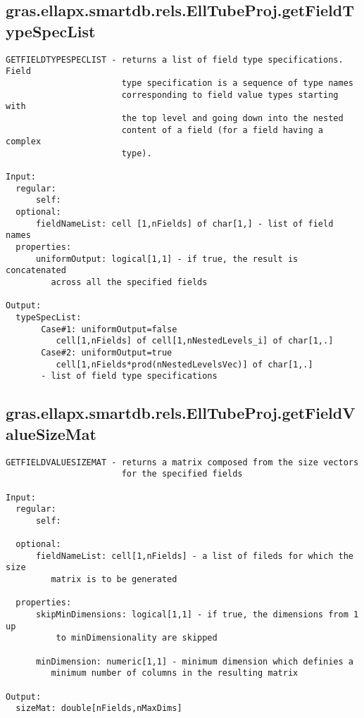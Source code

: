 \subsection{\texorpdfstring{gras.ellapx.smartdb.rels.EllTubeProj.getFieldTypeSpecList}{getFieldTypeSpecList}}\label{method:gras.ellapx.smartdb.rels.EllTubeProj.getFieldTypeSpecList}
\begin{verbatim}
GETFIELDTYPESPECLIST - returns a list of field type specifications. Field
                       type specification is a sequence of type names
                       corresponding to field value types starting with
                       the top level and going down into the nested
                       content of a field (for a field having a complex
                       type).

Input:
  regular:
      self:
  optional:
      fieldNameList: cell [1,nFields] of char[1,] - list of field names
  properties:
      uniformOutput: logical[1,1] - if true, the result is concatenated
         across all the specified fields

Output:
  typeSpecList:
       Case#1: uniformOutput=false
          cell[1,nFields] of cell[1,nNestedLevels_i] of char[1,.]
       Case#2: uniformOutput=true
          cell[1,nFields*prod(nNestedLevelsVec)] of char[1,.]
       - list of field type specifications
\end{verbatim}
\subsection{\texorpdfstring{gras.ellapx.smartdb.rels.EllTubeProj.getFieldValueSizeMat}{getFieldValueSizeMat}}\label{method:gras.ellapx.smartdb.rels.EllTubeProj.getFieldValueSizeMat}
\begin{verbatim}
GETFIELDVALUESIZEMAT - returns a matrix composed from the size vectors
                       for the specified fields

Input:
  regular:
      self:

  optional:
      fieldNameList: cell[1,nFields] - a list of fileds for which the size
         matrix is to be generated

  properties:
      skipMinDimensions: logical[1,1] - if true, the dimensions from 1 up
          to minDimensionality are skipped

      minDimension: numeric[1,1] - minimum dimension which definies a
         minimum number of columns in the resulting matrix

Output:
  sizeMat: double[nFields,nMaxDims]
\end{verbatim}
